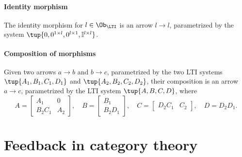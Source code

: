 \paragraph{Identity morphism}
The identity morphism for $l\in \Ob_\LTI$ is an arrow $l\to l$, parametrized by the system $\tup{0,0^{1\times l},0^{l\times 1},\mathbb{I}^{l\times l}}$.

\paragraph{Composition of morphisms}
Given two arrows $a\to b$ and $b\to c$, parametrized by the two LTI systems $\tup{A_1,B_1,C_1,D_1}$ and $\tup{A_2,B_2,C_2,D_2}$, their composition is an arrow $a\to c$, parametrized by the LTI system $\tup{A,B,C,D}$, where
\begin{equation}
    A=\begin{bmatrix}
          A_1&0\\
          B_2C_1&A_2
    \end{bmatrix},\quad
    B=\begin{bmatrix}
          B_1\\
          B_2D_1
    \end{bmatrix},\quad
    C=\begin{bmatrix}
          D_2C_1&C_2
    \end{bmatrix}, \quad
    D=D_2D_1.
\end{equation}


\section{Feedback in category theory}


